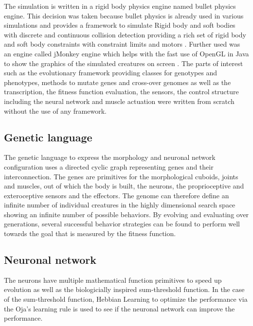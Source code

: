 \documentclass[letterpaper, 10 pt, conference]{ieeeconf}  %
\begin{document}
The simulation is written in a rigid body physics engine named bullet physics engine. This decision was taken because bullet physics is already used in various simulations and provides a framework to simulate Rigid body and soft bodies with discrete and continuous collision detection providing a rich set of rigid body and soft body constraints with constraint limits and motors \cite{bulletPhysics}. Further used was an engine called jMonkey engine which helps with the fast use of OpenGL in Java to show the graphics of the simulated creatures on screen \cite{jMonkeyEngine}. The parts of interest such as the evolutionary framework providing classes for genotypes and phenotypes, methods to mutate genes and cross-over genomes as well as the transcription, the fitness function evaluation, the sensors, the control structure including the neural network and muscle actuation were written from scratch without the use of any framework.

\subsection{Genetic language}
The genetic language to express the morphology and neuronal network configuration uses a directed cyclic graph representing genes and their interconnection. The genes are primitives for the morphological cuboids, joints and muscles, out of which the body is built, the neurons, the proprioceptive and exteroceptive sensors and the effectors.
The genome can therefore define an infinite number of individual creatures in the highly dimensional search space showing an infinite number of possible behaviors. By evolving and evaluating over generations, several successful behavior strategies can be found to perform well towards the goal that is measured by the fitness function.

\subsection{Neuronal network}
The neurons have multiple mathematical function primitives to speed up evolution as well as the biologicially inspired sum-threshold function. In the case of the sum-threshold function, Hebbian Learning to optimize the performance via the Oja's learning rule is used to see if the neuronal network can improve the performance. 
\end{document}
